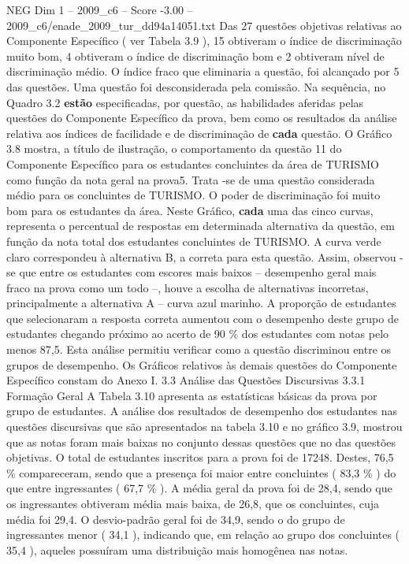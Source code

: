 \begin{textsample}{NEG Dim 1 – 2009\_c6 – Score -3.00 – 2009\_c6/enade\_2009\_tur\_dd94a14051.txt}
Das 27 questões objetivas relativas ao Componente Específico ( ver Tabela 3.9 ), 15 obtiveram o índice de discriminação muito bom, 4 obtiveram o índice de discriminação bom e 2 obtiveram nível de discriminação médio.
O índice fraco que eliminaria a questão, foi alcançado por 5 das questões.
Uma questão foi desconsiderada pela comissão.
Na sequência, no Quadro 3.2 \textbf{estão} especificadas, por questão, as habilidades aferidas pelas questões do Componente Específico da prova, bem como os resultados da análise relativa aos índices de facilidade e de discriminação de \textbf{cada} questão.
O Gráfico 3.8 mostra, a título de ilustração, o comportamento da questão 11 do Componente Específico para os estudantes concluintes da área de TURISMO como função da nota geral na prova5.
Trata -se de uma questão considerada médio para os concluintes de TURISMO.
O poder de discriminação foi muito bom para os estudantes da área.
Neste Gráfico, \textbf{cada} uma das cinco curvas, representa o percentual de respostas em determinada alternativa da questão, em função da nota total dos estudantes concluintes de TURISMO.
A curva verde claro correspondeu à alternativa B, a correta para esta questão.
Assim, observou -se que entre os estudantes com escores mais baixos – desempenho geral mais fraco na prova como um todo –, houve a escolha de alternativas incorretas, principalmente a alternativa A – curva azul marinho.
A proporção de estudantes que selecionaram a resposta correta aumentou com o desempenho deste grupo de estudantes chegando próximo ao acerto de 90 \% dos estudantes com notas pelo menos 87,5.
Esta análise permitiu verificar como a questão discriminou entre os grupos de desempenho.
Os Gráficos relativos às demais questões do Componente Específico constam do Anexo I. 3.3 Análise das Questões Discursivas 3.3.1 Formação Geral A Tabela 3.10 apresenta as estatísticas básicas da prova por grupo de estudantes.
A análise dos resultados de desempenho dos estudantes nas questões discursivas que são apresentados na tabela 3.10 e no gráfico 3.9, mostrou que as notas foram mais baixas no conjunto dessas questões que no das questões objetivas.
O total de estudantes inscritos para a prova foi de 17248.
Destes, 76,5 \% compareceram, sendo que a presença foi maior entre concluintes ( 83,3 \% ) do que entre ingressantes ( 67,7 \% ).
A média geral da prova foi de 28,4, sendo que os ingressantes obtiveram média mais baixa, de 26,8, que os concluintes, cuja média foi 29,4.
O desvio-padrão geral foi de 34,9, sendo o do grupo de ingressantes menor ( 34,1 ), indicando que, em relação ao grupo dos concluintes ( 35,4 ), aqueles possuíram uma distribuição mais homogênea nas notas.

\end{textsample}
